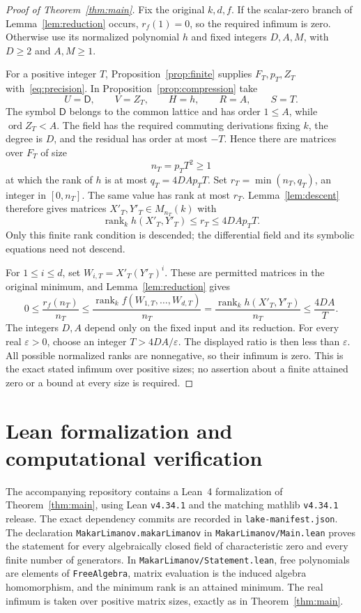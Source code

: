 \documentclass{article}
\newcommand{\DD}{\mathsf D}
\newcommand{\ord}{\operatorname{ord}}
\newcommand{\rank}{\operatorname{rank}}
\begin{document}
\begin{proof}[Proof of Theorem~\ref{thm:main}]
Fix the original $k,d,f$. If the scalar-zero branch of Lemma~\ref{lem:reduction} occurs, $r_f(1)=0$, so the required infimum is zero. Otherwise use its normalized polynomial $h$ and fixed integers $D,A,M$, with $D\geq2$ and $A,M\geq1$.

For a positive integer $T$, Proposition~\ref{prop:finite} supplies $F_T,p_T,Z_T$ with~\eqref{eq:precision}. In Proposition~\ref{prop:compression} take
\[
 U=\DD,\qquad V=Z_T,\qquad H=h,\qquad R=A,\qquad S=T.
\]
The symbol $\DD$ belongs to the common lattice and has order $1\leq A$, while $\ord Z_T<A$. The field has the required commuting derivations fixing $k$, the degree is $D$, and the residual has order at most $-T$. Hence there are matrices over $F_T$ of size
\[
 n_T=p_TT^2\geq1
\]
at which the rank of $h$ is at most $q_T=4DAp_TT$. Set $r_T=\min(n_T,q_T)$, an integer in $[0,n_T]$. The same value has rank at most $r_T$. Lemma~\ref{lem:descent} therefore gives matrices $X'_T,Y'_T\in M_{n_T}(k)$ with
\[
 \rank_k h(X'_T,Y'_T)\leq r_T\leq4DAp_TT.
\]
Only this finite rank condition is descended; the differential field and its symbolic equations need not descend.

For $1\leq i\leq d$, set $W_{i,T}=X'_T(Y'_T)^i$. These are permitted matrices in the original minimum, and Lemma~\ref{lem:reduction} gives
\[
 0\leq\frac{r_f(n_T)}{n_T}
 \leq\frac{\rank_k f(W_{1,T},\ldots,W_{d,T})}{n_T}
 =\frac{\rank_k h(X'_T,Y'_T)}{n_T}
 \leq\frac{4DA}{T}.
\]
The integers $D,A$ depend only on the fixed input and its reduction. For every real $\varepsilon>0$, choose an integer $T>4DA/\varepsilon$. The displayed ratio is then less than $\varepsilon$. All possible normalized ranks are nonnegative, so their infimum is zero. This is the exact stated infimum over positive sizes; no assertion about a finite attained zero or a bound at every size is required.
\end{proof}

\appendix
\section{Lean formalization and computational verification}\label{app:formalization}
The accompanying repository contains a Lean~4 formalization of
Theorem~\ref{thm:main}, using Lean \texttt{v4.34.1} and the matching
mathlib \texttt{v4.34.1} release. The exact dependency commits are recorded
in \texttt{lake-manifest.json}.
The declaration \texttt{MakarLimanov.makarLimanov} in
\texttt{MakarLimanov/Main.lean} proves the statement for every algebraically
closed field of characteristic zero and every finite number of generators.
In \texttt{MakarLimanov/Statement.lean}, free polynomials are elements of
\texttt{FreeAlgebra}, matrix evaluation is the induced algebra homomorphism,
and the minimum rank is an attained minimum. The real infimum is taken over
positive matrix sizes, exactly as in Theorem~\ref{thm:main}.
\end{document}
